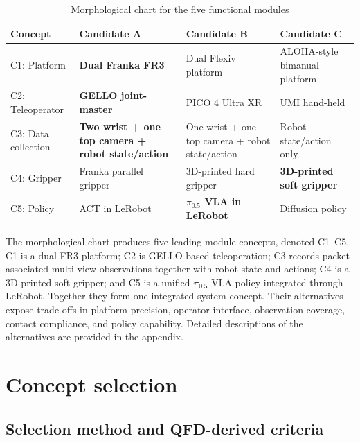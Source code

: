 \begin{table}[!htbp]
\centering
\caption{Morphological chart for the five functional modules}
\label{tab:morphological-chart}
\small
\begin{tabularx}{\textwidth}{p{}XXX}
\toprule
\textbf{Concept} & \textbf{Candidate A} & \textbf{Candidate B} & \textbf{Candidate C} \\
\midrule
C1: Platform & \textbf{Dual Franka FR3} & Dual Flexiv platform & ALOHA-style bimanual platform \\
C2: Teleoperator & \textbf{GELLO joint-master} & PICO 4 Ultra XR & UMI hand-held \\
C3: Data collection & \textbf{Two wrist + one top camera + robot state/action} & One wrist + one top camera + robot state/action & Robot state/action only \\
C4: Gripper & Franka parallel gripper & 3D-printed hard gripper & \textbf{3D-printed soft gripper} \\
C5: Policy & ACT in LeRobot & \textbf{$\pi_{0.5}$ VLA in LeRobot} & Diffusion policy \\
\bottomrule
\end{tabularx}
\end{table}

The morphological chart produces five leading module concepts, denoted C1--C5. C1 is a dual-FR3 platform; C2 is GELLO-based teleoperation; C3 records packet-associated multi-view observations together with robot state and actions; C4 is a 3D-printed soft gripper; and C5 is a unified $\pi_{0.5}$ VLA policy integrated through LeRobot. Together they form one integrated system concept. Their alternatives expose trade-offs in platform precision, operator interface, observation coverage, contact compliance, and policy capability. Detailed descriptions of the alternatives are provided in the appendix.

\section{Concept selection}

\subsection{Selection method and QFD-derived criteria}

